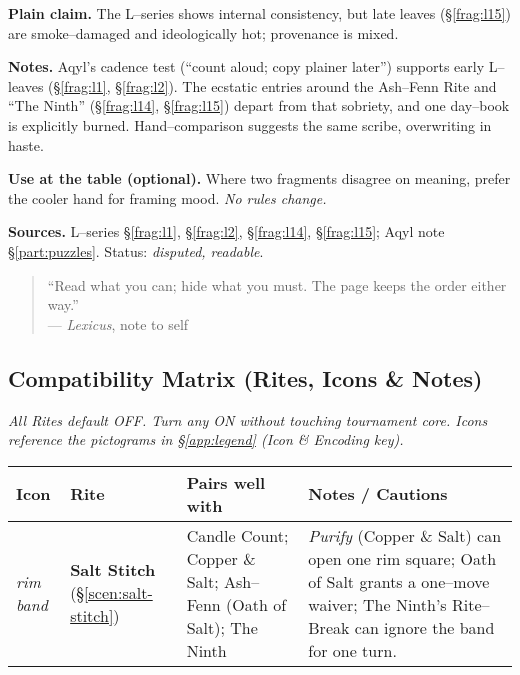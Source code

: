\documentclass[11pt]{article}
\renewcommand{\arraystretch}{1.15}
\begin{document}
\begin{itemize}
\noindent\textbf{Plain claim.} The L–series shows internal consistency, but late leaves (\S\ref{frag:l15}) are smoke–damaged and ideologically hot; provenance is mixed.

\medskip
\noindent\textbf{Notes.} Aqyl’s cadence test (“count aloud; copy plainer later”) supports early L–leaves (\S\ref{frag:l1}, \S\ref{frag:l2}). The ecstatic entries around the Ash–Fenn Rite and “The Ninth” (\S\ref{frag:l14}, \S\ref{frag:l15}) depart from that sobriety, and one day–book is explicitly burned. Hand–comparison suggests the same scribe, overwriting in haste.

\medskip
\noindent\textbf{Use at the table (optional).} Where two fragments disagree on meaning, prefer the cooler hand for framing mood. \emph{No rules change.}

\medskip
\noindent\textbf{Sources.} L–series \S\ref{frag:l1}, \S\ref{frag:l2}, \S\ref{frag:l14}, \S\ref{frag:l15}; Aqyl note \S\ref{part:puzzles}. Status: \emph{disputed, readable}.


\appendix
{}

\begin{quote}\small
“Read what you can; hide what you must. The page keeps the order either way.”\\
\hfill — \textit{Lexicus}, note to self
\end{quote}

\subsection{Compatibility Matrix (Rites, Icons \& Notes)}
\label{app:compat}
{}

\noindent\textit{All Rites default \textsc{OFF}. Turn any \textsc{ON} without touching tournament core. Icons reference the pictograms in \S\ref{app:legend} (Icon \& Encoding key).}

\medskip
\renewcommand{\arraystretch}{1.18}
\begin{tabular}{p{2.2cm} p{3.8cm} p{6.6cm} p{4.2cm}}
\toprule
\textbf{Icon} & \textbf{Rite} & \textbf{Pairs well with} & \textbf{Notes / Cautions}\\
\midrule
\textit{rim band} %
& \textbf{Salt Stitch} (\S\ref{scen:salt-stitch})
& Candle Count; Copper \& Salt; Ash–Fenn (Oath of Salt); The Ninth
& \emph{Purify} (Copper \& Salt) can open one rim square; Oath of Salt grants a one–move waiver; The Ninth’s Rite–Break can ignore the band for one turn.\\


\end{tabular}
\end{itemize}
\end{document}

